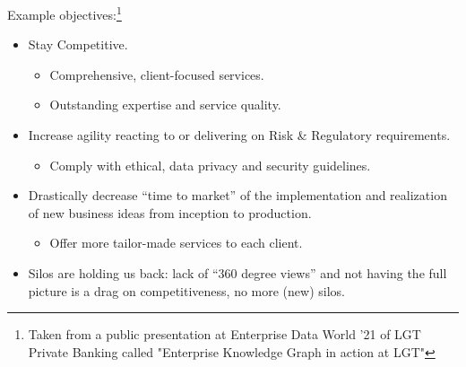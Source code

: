 %
%

Example objectives:\footnote{Taken from a public presentation at Enterprise Data World '21 of LGT Private Banking
called "Enterprise Knowledge Graph in action at LGT"}

\begin{itemize}
    \item Stay Competitive.
          \begin{itemize}
              \item Comprehensive, client-focused services.
              \item Outstanding expertise and service quality.
          \end{itemize}
    \item Increase agility reacting to or delivering on Risk \& Regulatory requirements.
          \begin{itemize}
              \item Comply with ethical, data privacy and security guidelines.
          \end{itemize}
    \item Drastically decrease \enquote{time to market} of the implementation and realization of new business ideas from
          inception to production.
          \begin{itemize}
              \item Offer more tailor-made services to each client.
          \end{itemize}
    \item Silos are holding us back: lack of \enquote{360 degree views} and not having the full picture is a
          drag on competitiveness, no more (new) silos.
\end{itemize}

\ekgmmContextSection


